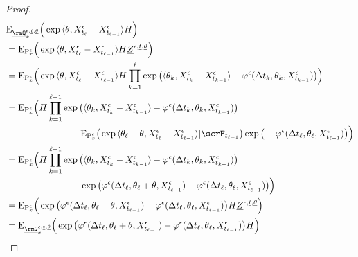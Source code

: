 \begin{proof}
  \begin{align*}
    &\Exp_{\fddPrb^{\epsilon, \underline t, \underline\twistVar}_\stateVar}\Big( \exp\prj{\twistVar}{\Xee_{t_\ell}-\Xee_{t_{\ell-1}}} H \Big) \\
    &=\Exp_{\Prb^\epsilon_\stateVar}\Big( \exp\prj{\twistVar}{\Xee_{t_\ell}-\Xee_{t_{\ell-1}}} H \fddDensity^{\epsilon,\underline t,\underline\twistVar} \Big)  \\
    &=\Exp_{\Prb^\epsilon_\stateVar}\Big( \exp\prj{\twistVar}{\Xee_{t_\ell}-\Xee_{t_{\ell-1}}} H \prod_{k=1}^\ell \exp\big(\prj{\twistVar_k}{\Xee_{t_k}-\Xee_{t_{k-1}}} - \affShift^\epsilon(\Delta t_k, \twistVar_k, \Xee_{t_{k-1}})\big) \Big)  \\
    &=\Exp_{\Prb^\epsilon_\stateVar}\Big( \begin{aligned}[t]
      &H  \prod_{k=1}^{\ell-1} \exp\big(\prj{\twistVar_k}{\Xee_{t_k}-\Xee_{t_{k-1}}} - \affShift^\epsilon(\Delta t_k, \twistVar_k, \Xee_{t_{k-1}})\big) \\
      &\hspace{16mm} \Exp_{\Prb^\epsilon_\stateVar}\big(\exp\prj{\twistVar_\ell + \twistVar}{\Xee_{t_\ell}-\Xee_{t_{\ell-1}}}|\scrF_{t_{\ell-1}}\big) \exp\big(-\affShift^\epsilon(\Delta t_\ell, \twistVar_\ell, \Xee_{t_{\ell-1}})\big) \Big)
    \end{aligned} \\
    &=\Exp_{\Prb^\epsilon_\stateVar}\Big( \begin{aligned}[t]
      &H  \prod_{k=1}^{\ell-1} \exp\big(\prj{\twistVar_k}{\Xee_{t_k}-\Xee_{t_{k-1}}} - \affShift^\epsilon(\Delta t_k, \twistVar_k, \Xee_{t_{k-1}})\big) \\
      &\hspace{16mm} \exp\big(\affShift^\epsilon(\Delta t_\ell, \twistVar_\ell + \twistVar, \Xee_{t_{\ell-1}})-\affShift^\epsilon(\Delta t_\ell, \twistVar_\ell, \Xee_{t_{\ell-1}})\big) \Big)
    \end{aligned} \\
    &=\Exp_{\Prb^\epsilon_\stateVar}\Big( \exp\big(\affShift^\epsilon(\Delta t_\ell, \twistVar_\ell + \twistVar, \Xee_{t_{\ell-1}})-\affShift^\epsilon(\Delta t_\ell, \twistVar_\ell, \Xee_{t_{\ell-1}})\big) H \fddDensity^{\epsilon,\underline t,\underline\twistVar} \Big) \\
    &=\Exp_{\fddPrb^{\epsilon, \underline t, \underline\twistVar}_\stateVar}\Big( \exp\big(\affShift^\epsilon(\Delta t_\ell, \twistVar_\ell + \twistVar, \Xee_{t_{\ell-1}})-\affShift^\epsilon(\Delta t_\ell, \twistVar_\ell, \Xee_{t_{\ell-1}})\big) H \Big) 

\end{align*}
\end{proof}

